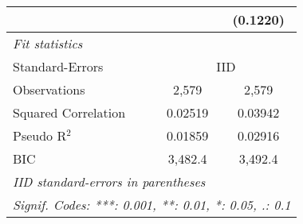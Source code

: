 \begin{tabular}{lcc}
                                         &                 & (0.1220)\\   
   \midrule
   \emph{Fit statistics}\\
   Standard-Errors & \multicolumn{2}{c}{IID} \\ 
   Observations                          & 2,579           & 2,579\\  
   Squared Correlation                   & 0.02519         & 0.03942\\  
   Pseudo R$^2$                          & 0.01859         & 0.02916\\  
   BIC                                   & 3,482.4         & 3,492.4\\  
   \midrule \midrule
   \multicolumn{3}{l}{\emph{IID standard-errors in parentheses}}\\
   \multicolumn{3}{l}{\emph{Signif. Codes: ***: 0.001, **: 0.01, *: 0.05, .: 0.1}}\\
\end{tabular}
\par\endgroup


